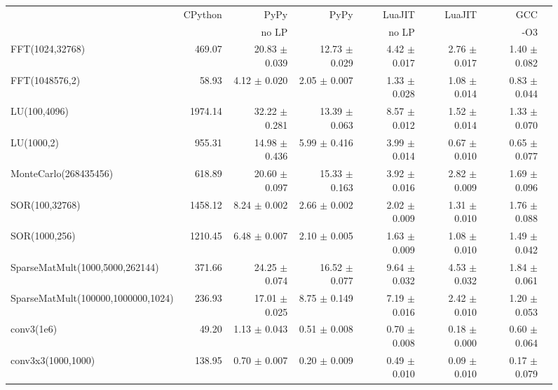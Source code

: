 \documentclass[preprint]{sigplanconf}
\begin{document}
\begin{figure}
\begin{center}
{\smaller
\begin{tabular}{|l|r|r|r|r|r|r|r|}
\hline
 & CPython & PyPy  & PyPy & LuaJIT & LuaJIT & GCC \\
 &         & no LP &      & no LP  &        & -O3 \\
\hline
FFT(1024,32768) & 469.07 & 20.83 $\pm$ 0.039 & 12.73 $\pm$ 0.029 & 4.42 $\pm$ 0.017 & 2.76 $\pm$ 0.017 & 1.40 $\pm$ 0.082\\
\hline
FFT(1048576,2) & 58.93 & 4.12 $\pm$ 0.020 & 2.05 $\pm$ 0.007 & 1.33 $\pm$ 0.028 & 1.08 $\pm$ 0.014 & 0.83 $\pm$ 0.044\\
\hline
LU(100,4096) & 1974.14 & 32.22 $\pm$ 0.281 & 13.39 $\pm$ 0.063 & 8.57 $\pm$ 0.012 & 1.52 $\pm$ 0.014 & 1.33 $\pm$ 0.070\\
\hline
LU(1000,2) & 955.31 & 14.98 $\pm$ 0.436 & 5.99 $\pm$ 0.416 & 3.99 $\pm$ 0.014 & 0.67 $\pm$ 0.010 & 0.65 $\pm$ 0.077\\
\hline
MonteCarlo(268435456) & 618.89 & 20.60 $\pm$ 0.097 & 15.33 $\pm$ 0.163 & 3.92 $\pm$ 0.016 & 2.82 $\pm$ 0.009 & 1.69 $\pm$ 0.096\\
\hline
SOR(100,32768) & 1458.12 & 8.24 $\pm$ 0.002 & 2.66 $\pm$ 0.002 & 2.02 $\pm$ 0.009 & 1.31 $\pm$ 0.010 & 1.76 $\pm$ 0.088\\
\hline
SOR(1000,256) & 1210.45 & 6.48 $\pm$ 0.007 & 2.10 $\pm$ 0.005 & 1.63 $\pm$ 0.009 & 1.08 $\pm$ 0.010 & 1.49 $\pm$ 0.042\\
\hline
SparseMatMult(1000,5000,262144) & 371.66 & 24.25 $\pm$ 0.074 & 16.52 $\pm$ 0.077 & 9.64 $\pm$ 0.032 & 4.53 $\pm$ 0.032 & 1.84 $\pm$ 0.061\\
\hline
SparseMatMult(100000,1000000,1024) & 236.93 & 17.01 $\pm$ 0.025 & 8.75 $\pm$ 0.149 & 7.19 $\pm$ 0.016 & 2.42 $\pm$ 0.010 & 1.20 $\pm$ 0.053\\
\hline
\hline
conv3(1e6) & 49.20 & 1.13 $\pm$ 0.043 & 0.51 $\pm$ 0.008 & 0.70 $\pm$ 0.008 & 0.18 $\pm$ 0.000 & 0.60 $\pm$ 0.064\\
\hline
conv3x3(1000,1000) & 138.95 & 0.70 $\pm$ 0.007 & 0.20 $\pm$ 0.009 & 0.49 $\pm$ 0.010 & 0.09 $\pm$ 0.010 & 0.17 $\pm$ 0.079\\
\hline

\end{tabular}}
\end{center}
\end{figure}
\end{document}
